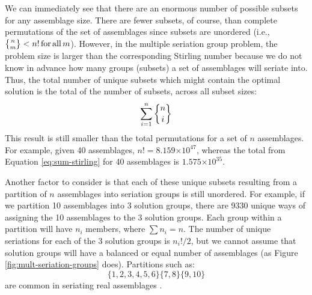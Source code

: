 \documentclass[preprint,times,authoryear,12pt]{els-workingpaper}
\newcommand{\stirlingsubset}[2]{\ensuremath{\genfrac{\lbrace}{\rbrace}{0pt}{}{#1}{#2}}}
\providecommand{\e}[1]{\ensuremath{\times 10^{#1}}}
\begin{document}
We can immediately see that there are an enormous number of possible subsets for any assemblage size.  There are fewer subsets, of course, than complete permutations of the set of assemblages since subsets are unordered (i.e., $\stirlingsubset{n}{m} < n! \,\mathrm{for\,all }\,m$).  However, in the multiple seriation group problem, the problem size is larger than the corresponding Stirling number because we do not know in advance how many groups (subsets) a set of assemblages will seriate into.  Thus, the total number of unique subsets which might contain the optimal solution is the total of the number of subsets, across all subset sizes:
\begin{equation}
\sum_{i=1}^n \stirlingsubset{n}{i}
\label{eq:sum-stirling}
\end{equation}
This result is still smaller than the total permutations for a set of $n$ assemblages.  For example, given 40 assemblages, $n! = 8.159\e{47}$, whereas the total from Equation \ref{eq:sum-stirling} for 40 assemblages is $1.575\e{35}$.  

Another factor to consider is that each of these unique subsets resulting from a partition of $n$ assemblages into seriation groups is still unordered.  For example, if we partition 10 assemblages into 3 solution groups, there are 9330 unique ways of assigning the 10 assemblages to the 3 solution groups.  Each group within a partition will have $n_i$ members, where $\sum n_i = n$.   The number of unique seriations for each of the 3 solution groups is $n_i ! / 2$, but we cannot assume that solution groups will have a balanced or equal number of assemblages (as Figure \ref{fig:mult-seriation-groups} does).  Partitions such as:
\begin{equation*}
\{1,2,3,4,5,6\} \{7,8\} \{9,10\}  
\end{equation*}
are common in seriating real assemblages \citep{Lipo2001b}.   





\end{document}
